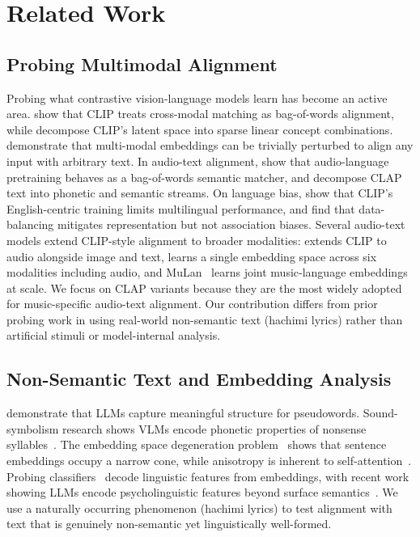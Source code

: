 \documentclass[11pt]{article}
\begin{document}
\section{Related Work}\label{sec:related}

\subsection{Probing Multimodal Alignment}

Probing what contrastive vision-language models learn has become an active area. \citet{koishigarina2025clip} show that CLIP treats cross-modal matching as bag-of-words alignment, while \citet{bhalla2024splice} decompose CLIP's latent space into sparse linear concept combinations. \citet{zhang2024adversarial} demonstrate that multi-modal embeddings can be trivially perturbed to align any input with arbitrary text. In audio-text alignment, \citet{tseng2025revisiting} show that audio-language pretraining behaves as a bag-of-words semantic matcher, and \citet{ye2023clapspeech} decompose CLAP text into phonetic and semantic streams. On language bias, \citet{yang2024language} show that CLIP's English-centric training limits multilingual performance, and \citet{balaji2024clip} find that data-balancing mitigates representation but not association biases. Several audio-text models extend CLIP-style alignment to broader modalities: \citet{chen2022audioclip} extends CLIP to audio alongside image and text, \citet{girdhar2023imagebind} learns a single embedding space across six modalities including audio, and MuLan~\citep{huang2022mulan} learns joint music-language embeddings at scale. We focus on CLAP variants because they are the most widely adopted for music-specific audio-text alignment. Our contribution differs from prior probing work in using real-world non-semantic text (hachimi lyrics) rather than artificial stimuli or model-internal analysis.

\subsection{Non-Semantic Text and Embedding Analysis}

\citet{formanier2024meaning} demonstrate that LLMs capture meaningful structure for pseudowords. Sound-symbolism research shows VLMs encode phonetic properties of nonsense syllables~\citep{masson2023kiki}. The embedding space degeneration problem~\citep{li2020on} shows that sentence embeddings occupy a narrow cone, while anisotropy is inherent to self-attention~\citep{hallinan2024anisotropy}. Probing classifiers~\citep{alain2019supervised} decode linguistic features from embeddings, with recent work showing LLMs encode psycholinguistic features beyond surface semantics~\citep{clark2026probing}. We use a naturally occurring phenomenon (hachimi lyrics) to test alignment with text that is genuinely non-semantic yet linguistically well-formed.
\end{document}
